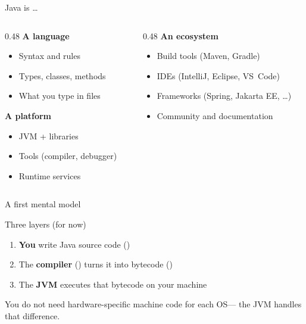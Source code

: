 \documentclass[aspectratio=169,11pt]{beamer}
\begin{document}
    \begin{frame}{Java is \ldots}
        \begin{columns}[T]
            \begin{column}{0.48\textwidth}
                \textbf{A language}
                \begin{itemize}
                    \item Syntax and rules
                    \item Types, classes, methods
                    \item What you type in  files
                \end{itemize}
                \vspace{1em}
                \textbf{A platform}
                \begin{itemize}
                    \item JVM + libraries
                    \item Tools (compiler, debugger)
                    \item Runtime services
                \end{itemize}
            \end{column}
            \begin{column}{0.48\textwidth}
                \textbf{An ecosystem}
                \begin{itemize}
                    \item Build tools (Maven, Gradle)
                    \item IDEs (IntelliJ, Eclipse, VS~Code)
                    \item Frameworks (Spring, Jakarta EE, \ldots)
                    \item Community and documentation
                \end{itemize}
            \end{column}
        \end{columns}
    \end{frame}

    \begin{frame}{A first mental model}
        \begin{block}{Three layers (for now)}
            \begin{enumerate}
                \item \textbf{You} write Java source code ()
                \item The \textbf{compiler} () turns it into bytecode ()
                \item The \textbf{JVM} executes that bytecode on your machine
            \end{enumerate}
        \end{block}
        \vspace{0.6em}
        You do not need hardware-specific machine code for each OS---
        the JVM handles that difference.
    \end{frame}
\end{document}
